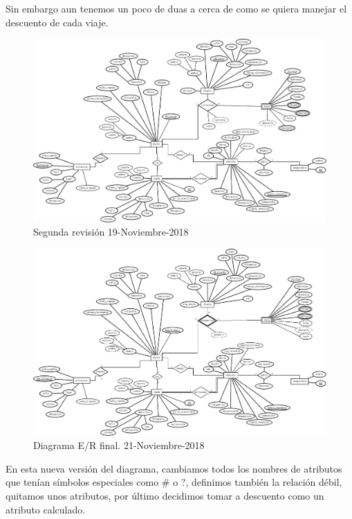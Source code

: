\documentclass{article}
\begin{document}
Sin embargo aun tenemos un poco de duas a cerca de como se quiera manejar el descuento de cada viaje.\\
\begin{figure}[H]
\begin{center}
\includegraphics[width=5in]{./img/R_boceto2.jpeg}
\caption{Segunda revisión 19-Noviembre-2018}
\end{center}
\end{figure}
\begin{figure}[H]
\begin{center}
\includegraphics[width=5in]{./img/R_boceto3.jpeg}
\caption{Diagrama E/R final. 21-Noviembre-2018 }
\end{center}
\end{figure}
En esta nueva versión del diagrama, cambiamos todos los nombres de atributos que tenían símbolos especiales como \# o ?,
definimos también la relación débil,  quitamos unos atributos, por último decidimos tomar a descuento como un atributo calculado.\\
\end{document}
